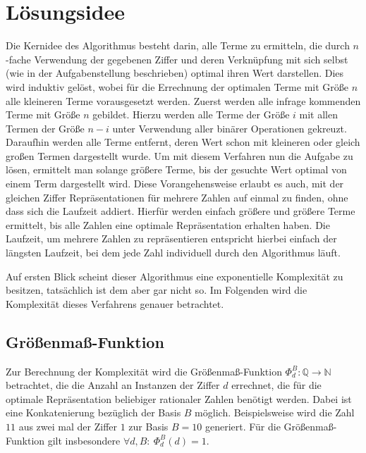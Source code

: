 \documentclass{article}
\theoremstyle{nonumberplain}
\begin{document}
\section{Lösungsidee}

Die Kernidee des Algorithmus besteht darin, alle Terme zu ermitteln, die durch \(n\)-fache Verwendung der gegebenen Ziffer und deren Verknüpfung mit sich selbst (wie in der Aufgabenstellung beschrieben) optimal ihren Wert darstellen.
Dies wird induktiv gelöst, wobei für die Errechnung der optimalen Terme mit Größe \(n\) alle kleineren Terme vorausgesetzt werden.
Zuerst werden alle infrage kommenden Terme mit Größe \(n\) gebildet. Hierzu werden alle Terme der Größe \(i\) mit allen Termen der Größe \(n-i\) unter Verwendung aller binärer Operationen gekreuzt.
Daraufhin werden alle Terme entfernt, deren Wert schon mit kleineren oder gleich großen Termen dargestellt wurde.
Um mit diesem Verfahren nun die Aufgabe zu lösen, ermittelt man solange größere Terme, bis der gesuchte Wert optimal von einem Term dargestellt wird.
Diese Vorangehensweise erlaubt es auch, mit der gleichen Ziffer Repräsentationen für mehrere Zahlen auf einmal zu finden, ohne dass sich die Laufzeit addiert.
Hierfür werden einfach größere und größere Terme ermittelt, bis alle Zahlen eine optimale Repräsentation erhalten haben.
Die Laufzeit, um mehrere Zahlen zu repräsentieren entspricht hierbei einfach der längsten Laufzeit, bei dem jede Zahl individuell durch den Algorithmus läuft.

Auf ersten Blick scheint dieser Algorithmus eine exponentielle Komplexität zu besitzen, tatsächlich ist dem aber gar nicht so.
Im Folgenden wird die Komplexität dieses Verfahrens genauer betrachtet.

\newcommand{\fad}{\forall d, B:\ }
\newcommand{\measure}[1]{\Phi_{d}^{B}(#1)}

\subsection{Größenmaß-Funktion}

Zur Berechnung der Komplexität wird die Größenmaß-Funktion \(\Phi_{d}^{B} : \mathbb{Q} \to \mathbb{N}\) betrachtet, die die Anzahl an Instanzen der Ziffer \(d\) errechnet, die für die optimale Repräsentation beliebiger rationaler Zahlen benötigt werden. Dabei ist eine Konkatenierung bezüglich der Basis \(B\) möglich. Beispielsweise wird die Zahl \(11\) aus zwei mal der Ziffer \(1\)  zur Basis \(B=10\) generiert. Für die Größenmaß-Funktion gilt insbesondere \(\fad\measure{d} = 1\).
\end{document}
